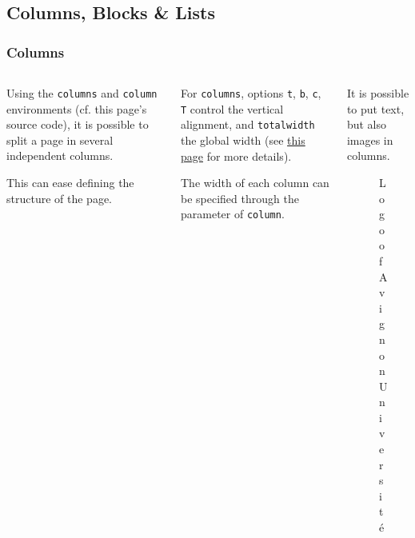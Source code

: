 \documentclass[10pt,    %
    english,            %
    xcolor=table,       %
    envcountsect,       %
    aspectratio=43      %
]{beamer}
\begin{document}
\subsection{Columns, Blocks \& Lists}
\begin{frame}
    \frametitle{Columns}
    
    \begin{columns}[T,totalwidth=\textwidth] %
        \begin{column}{0.33\textwidth}
            Using the \texttt{columns} and \texttt{column} environments (cf. this page's source code), it is possible to split a page in several independent columns. 
            
            This can ease defining the structure of the page.
        \end{column}
        
        \begin{column}{0.33\textwidth}
            For \texttt{columns}, options \texttt{t}, \texttt{b}, \texttt{c}, \texttt{T} control the vertical alignment, and \texttt{totalwidth} the global width (see \href{https://tex.stackexchange.com/a/51509/31360}{this page} for more details).
            
            The width of each column can be specified through the parameter of \texttt{column}.
        \end{column}
        
        \begin{column}{0.33\textwidth}
            It is possible to put text, but also images in columns.
            \begin{figure}[H]
                \centering
                \href{http://univ-avignon.fr}{}
                \vspace{-0.5cm}
                \caption{Logo of Avignon Université}
                \label{fig:AUlogo}
            \end{figure}
        \end{column}
    \end{columns}


\end{frame}
\end{document}
